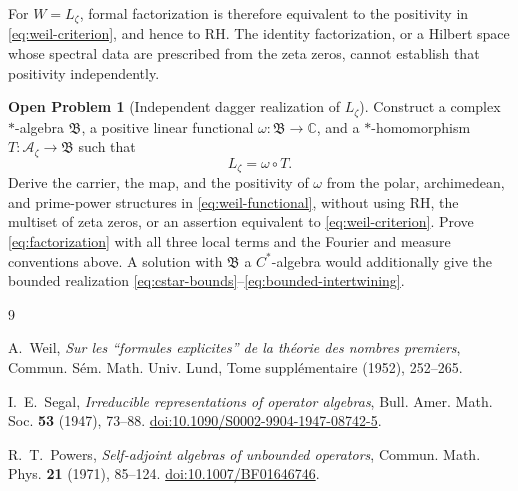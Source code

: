 \documentclass[11pt]{article}
\theoremstyle{definition}
\newtheorem{problem}[theorem]{Open Problem}
\theoremstyle{remark}
\numberwithin{equation}{section}
\newcommand{\cA}{\mathcal A}
\newcommand{\C}{\mathbb C}
\begin{document}
For $W=L_\zeta$, formal factorization is therefore equivalent to the
positivity in \eqref{eq:weil-criterion}, and hence to RH.  The identity
factorization, or a Hilbert space whose spectral data are prescribed from
the zeta zeros, cannot establish that positivity independently.

\begin{problem}[Independent dagger realization of $L_\zeta$]
Construct a complex $*$-algebra $\mathfrak B$, a positive linear
functional $\omega:\mathfrak B\to\C$, and a $*$-homomorphism
$T:\cA_\zeta\to\mathfrak B$ such that
\begin{equation}
 L_\zeta=\omega\circ T.
 \label{eq:factorization}
\end{equation}
Derive the carrier, the map, and the positivity of $\omega$ from the
polar, archimedean, and prime-power structures in
\eqref{eq:weil-functional}, without using RH, the multiset of zeta zeros,
or an assertion equivalent to \eqref{eq:weil-criterion}.  Prove
\eqref{eq:factorization} with all three local terms and the Fourier and
measure conventions above.  A solution with $\mathfrak B$ a
$C^*$-algebra would additionally give the bounded realization
\eqref{eq:cstar-bounds}--\eqref{eq:bounded-intertwining}.
\end{problem}

\begin{thebibliography}{9}

A.~Weil,
\emph{Sur les ``formules explicites'' de la th\'eorie des nombres premiers},
Commun. S\'em. Math. Univ. Lund, Tome suppl\'ementaire (1952), 252--265.

I.~E.~Segal,
\emph{Irreducible representations of operator algebras},
Bull. Amer. Math. Soc. \textbf{53} (1947), 73--88.
\href{https://doi.org/10.1090/S0002-9904-1947-08742-5}
{doi:10.1090/S0002-9904-1947-08742-5}.

R.~T.~Powers,
\emph{Self-adjoint algebras of unbounded operators},
Commun. Math. Phys. \textbf{21} (1971), 85--124.
\href{https://doi.org/10.1007/BF01646746}
{doi:10.1007/BF01646746}.

\end{thebibliography}
\end{document}
